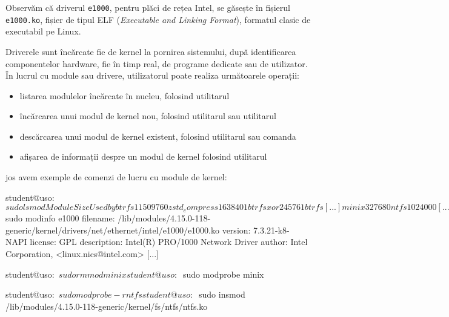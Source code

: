 
Observăm că driverul \texttt{e1000}, pentru plăci de rețea Intel, se găsește în fișierul \texttt{e1000.ko}, fișier de tipul ELF (\textit{Executable and Linking Format}), formatul clasic de executabil pe Linux.

Driverele sunt încărcate fie de kernel la pornirea sistemului, după identificarea componentelor hardware, fie în timp real, de programe dedicate sau de utilizator.
În lucrul cu module sau drivere, utilizatorul poate realiza următoarele operații:

\begin{itemize}
  \item listarea modulelor încărcate în nucleu, folosind utilitarul 
  \item încărcarea unui modul de kernel nou, folosind utilitarul  sau utilitarul 
  \item descărcarea unui modul de kernel existent, folosind utilitarul  sau comanda 
  \item afișarea de informații despre un modul de kernel folosind utilitarul 
\end{itemize}

 jos avem exemple de comenzi de lucru cu module de kernel:

\begin{screen}[caption={Lucrul cu module de kernel în Linux},label={lst:boot:modules}]
student@uso:~$ sudo lsmod
Module                  Size  Used by
btrfs                1150976  0
zstd_compress         163840  1 btrfs
xor                    24576  1 btrfs
[...]
minix                  32768  0
ntfs                  102400  0
[...]

student@uso:~$ sudo modinfo e1000
filename:       /lib/modules/4.15.0-118-generic/kernel/drivers/net/ethernet/intel/e1000/e1000.ko
version:        7.3.21-k8-NAPI
license:        GPL
description:    Intel(R) PRO/1000 Network Driver
author:         Intel Corporation, <linux.nics@intel.com>
[...]

student@uso:~$ sudo rmmod minix

student@uso:~$ sudo modprobe minix

student@uso:~$ sudo modprobe -r ntfs

student@uso:~$ sudo insmod /lib/modules/4.15.0-118-generic/kernel/fs/ntfs/ntfs.ko
\end{screen}

